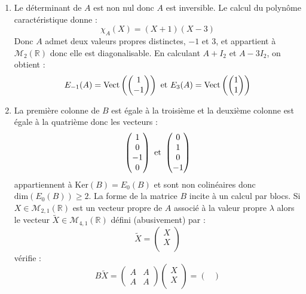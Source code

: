 \documentclass[a4paper,10pt]{report}
\begin{document}
\corr \begin{enumerate}
\item Le déterminant de $A$ est non nul donc $A$ est inversible. Le calcul du polynôme caractéristique donne :
$$ \chi_A(X) = (X+1)(X-3)$$
Donc $A$ admet deux valeurs propres distinctes, $-1$ et $3$, et appartient à $\mathcal{M}_2(\mathbb{R})$ donc elle est diagonalisable. En calculant $A+I_2$ et $A-3I_2$, on obtient :
$$ E_{-1}(A) = \textrm{Vect} \left( \begin{pmatrix}
1 \\
-1 \\
\end{pmatrix}\right) \hbox{ et } E_{3}(A) = \textrm{Vect} \left( \begin{pmatrix}
1 \\
1 \\
\end{pmatrix}\right)$$
\item La première colonne de $B$ est égale à la troisième et la deuxième colonne est égale à la quatrième donc les vecteurs :
$$ \begin{pmatrix}
1 \\
0 \\
-1 \\
0
\end{pmatrix} \hbox{ et } \begin{pmatrix}
0 \\
1 \\
0 \\
-1
\end{pmatrix}$$
appartiennent à $\textrm{Ker}(B)= E_0(B)$ et sont non colinéaires donc $\textrm{dim}(E_0(B)) \geq 2$. La forme de la matrice $B$ incite à un calcul par blocs. Si $X \in \mathcal{M}_{2,1}(\mathbb{R})$ est un vecteur propre de $A$ associé à la valeur propre $\lambda$ alors le vecteur $\tilde{X} \in \mathcal{M}_{4,1}(\mathbb{R})$ défini (abusivement) par :
$$ \tilde{X} = \begin{pmatrix}
X \\
X \\
\end{pmatrix}$$
vérifie :
$$ B \tilde{X} = \begin{pmatrix}
A & A \\
A & A 
\end{pmatrix} \begin{pmatrix}
X \\
X \\
\end{pmatrix} = \begin{pmatrix}

\end{pmatrix}$$
\end{enumerate}
\end{document}
